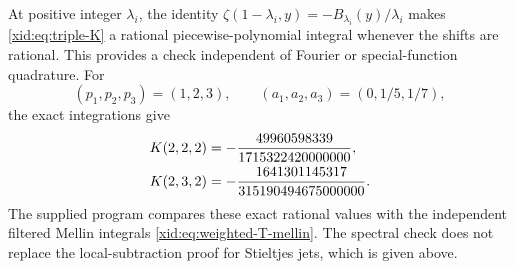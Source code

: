 At positive integer $\lambda_i$, the identity
$\zeta(1-\lambda_i,y)=-B_{\lambda_i}(y)/\lambda_i$ makes
\eqref{xid:eq:triple-K} a rational piecewise-polynomial integral whenever
the shifts are rational.  This provides a check independent of Fourier
or special-function quadrature.  For
\[
 (p_1,p_2,p_3)=(1,2,3),\qquad
 (a_1,a_2,a_3)=(0,1/5,1/7),
\]
the exact integrations give
\begin{align}
 K(2,2,2)&=-\frac{49960598339}{1715322420000000},\notag\\
 K(2,3,2)&=-\frac{1641301145317}{315190494675000000}.
 \label{xid:eq:triple-rational-checks}
\end{align}
The supplied program compares these exact rational values with the
independent filtered Mellin integrals \eqref{xid:eq:weighted-T-mellin}.
The spectral check does not replace the local-subtraction proof for
Stieltjes jets, which is given above.
